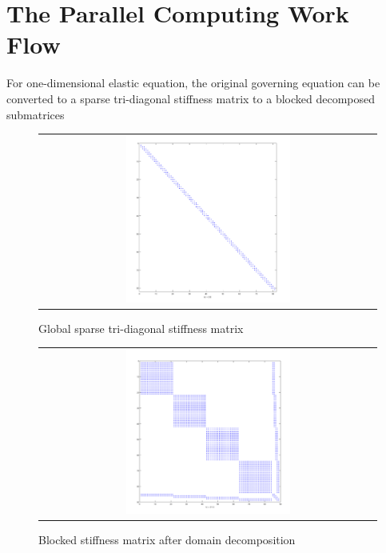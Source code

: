 \section{The Parallel Computing Work Flow}

For one-dimensional elastic equation, the original governing equation can be converted to a sparse tri-diagonal stiffness matrix to a blocked decomposed submatrices

 \begin{figure}[h]
 	\centering
 	\begin{tabular}{c}
 		\includegraphics[width=0.5\textwidth]{./pics/matrix1.png}
 	\end{tabular}
 	\caption{\footnotesize Global sparse tri-diagonal stiffness matrix}
 \end{figure}
 
  \begin{figure}[h]
  	\centering
  	\begin{tabular}{c}
  		\includegraphics[width=0.5\textwidth]{./pics/hmatrix1.png}
  	\end{tabular}
  	\caption{\footnotesize Blocked stiffness matrix after domain decomposition}
  \end{figure}
  
